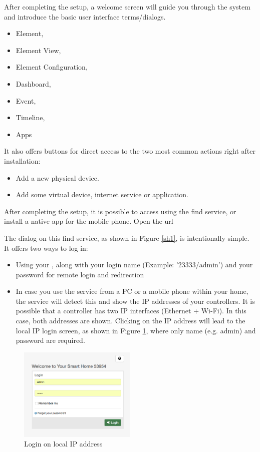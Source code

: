 After completing the setup, a welcome screen will guide you through the system and 
introduce the basic user interface terms/dialogs.

\begin{itemize}
\item Element,
\item Element View,
\item Element Configuration,
\item Dashboard,
\item Event,
\item Timeline,
\item Apps
\end{itemize}

It also offers buttons for direct access to the two most common actions right after installation:

\begin{itemize}
\item Add a new physical device.
\item Add some virtual device, internet service or application.
\end{itemize}

After completing the setup, it is possible to access \zway using the find service, or install 
a native app for the mobile phone. Open the url 

The dialog on this find service, as shown in Figure \ref{sh1}, is intentionally 
simple. It offers two ways to log in:

\begin{itemize}
\item Using your \zwaydeviceid, along with your login name (Example: '23333/admin') and 
your password for remote login and redirection
\item In case you use the service from a PC or a mobile phone within your home, the 
service will detect this and show the IP addresses of your \zway controllers. It 
is possible that a \zway controller has two IP interfaces (Ethernet + Wi-Fi). In 
this case, both addresses are shown. Clicking on the IP address will lead to the 
local IP login screen, as shown in Figure \ref{init2}, where only name (e.g. admin) and 
password are required.
\end{itemize}

\begin{figure}
\begin{center}
\includegraphics[width=0.5\textwidth]{pngs/cap3/init2.png}
\caption{Login on local IP address}
\label{init2}
\end{center}
\end{figure}

